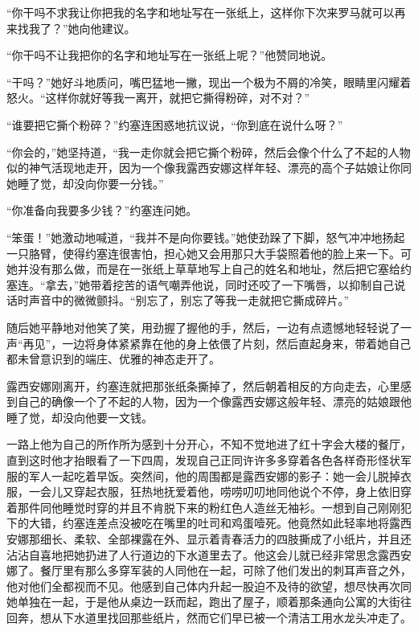     “你干吗不求我让你把我的名字和地址写在一张纸上，这样你下次来罗马就可以再来找我了？”她向他建议。

    “你干吗不让我把你的名字和地址写在一张纸上呢？”他赞同地说。

    “干吗？”她好斗地质问，嘴巴猛地一撇，现出一个极为不屑的冷笑，眼睛里闪耀着怒火。“这样你就好等我一离开，就把它撕得粉碎，对不对？”

    “谁要把它撕个粉碎？”约塞连困惑地抗议说，“你到底在说什么呀？”

    “你会的，”她坚持道，“我一走你就会把它撕个粉碎，然后会像个什么了不起的人物似的神气活现地走开，因为一个像我露西安娜这样年轻、漂亮的高个子姑娘让你同她睡了觉，却没向你要一分钱。”

    “你准备向我要多少钱？”约塞连问她。

    “笨蛋！”她激动地喊道，“我并不是向你要钱。”她使劲跺了下脚，怒气冲冲地扬起一只胳臂，使得约塞连很害怕，担心她又会用那只大手袋照着他的脸上来一下。可她并没有那么做，而是在一张纸上草草地写上自己的姓名和地址，然后把它塞给约塞连。“拿去，”她带着挖苦的语气嘲弄他说，同时还咬了一下嘴唇，以抑制自己说话时声音中的微微颤抖。“别忘了，别忘了等我一走就把它撕成碎片。”

    随后她平静地对他笑了笑，用劲握了握他的手，然后，一边有点遗憾地轻轻说了一声“再见”，一边将身体紧紧靠在他的身上依偎了片刻，然后直起身来，带着她自己都未曾意识到的端庄、优雅的神态走开了。

    露西安娜刚离开，约塞连就把那张纸条撕掉了，然后朝着相反的方向走去，心里感到自己的确像一个了不起的人物，因为一个像露西安娜这般年轻、漂亮的姑娘跟他睡了觉，却没向他要一文钱。
 


    一路上他为自己的所作所为感到十分开心，不知不觉地进了红十字会大楼的餐厅，直到这时他才抬眼看了一下四周，发现自己正同许许多多穿着各色各样奇形怪状军服的军人一起吃着早饭。突然间，他的周围都是露西安娜的影子：她一会儿脱掉衣服，一会儿又穿起衣服，狂热地抚爱着他，唠唠叨叨地同他说个不停，身上依旧穿着那件同他睡觉时穿的并且不肯脱下来的粉红色人造丝无袖衫。一想到自己刚刚犯下的大错，约塞连差点没被吃在嘴里的吐司和鸡蛋噎死。他竟然如此轻率地将露西安娜那细长、柔软、全部裸露在外、显示着青春活力的四肢撕成了小纸片，并且还沾沾自喜地把她扔进了人行道边的下水道里去了。他这会儿就已经非常思念露西安娜了。餐厅里有那么多穿军装的人同他在一起，可除了他们发出的刺耳声音之外，他对他们全都视而不见。他感到自己体内升起一股迫不及待的欲望，想尽快再次同她单独在一起，于是他从桌边一跃而起，跑出了屋子，顺着那条通向公寓的大街往回奔，想从下水道里找回那些纸片，然而它们早已被一个清洁工用水龙头冲走了。


